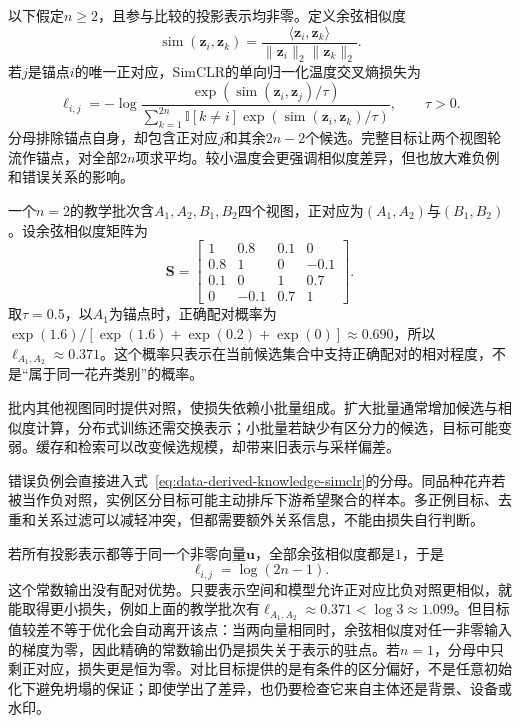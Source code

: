 以下假定$n\geq2$，且参与比较的投影表示均非零。定义余弦相似度
\[
  \operatorname{sim}(\bm{z}_i,\bm{z}_k)
  =\frac{\langle\bm{z}_i,\bm{z}_k\rangle}
  {\lVert\bm{z}_i\rVert_2\lVert\bm{z}_k\rVert_2}.
\]
若$j$是锚点$i$的唯一正对应，SimCLR的单向归一化温度交叉熵损失为
\begin{equation}
  \ell_{i,j}
  =-\log
  \frac{\exp\!\left(\operatorname{sim}(\bm{z}_i,\bm{z}_j)/\tau\right)}
  {\displaystyle\sum_{k=1}^{2n}\mathbb{I}[k\neq i]\exp\!\left(\operatorname{sim}(\bm{z}_i,\bm{z}_k)/\tau\right)},
  \qquad \tau>0.
  \label{eq:data-derived-knowledge-simclr}
\end{equation}
分母排除锚点自身，却包含正对应$j$和其余$2n-2$个候选。完整目标让两个视图轮流作锚点，对全部$2n$项求平均。较小温度会更强调相似度差异，但也放大难负例和错误关系的影响。

一个$n=2$的教学批次含$A_1,A_2,B_1,B_2$四个视图，正对应为$(A_1,A_2)$与$(B_1,B_2)$。设余弦相似度矩阵为
\[
  \bm{S}=
  \begin{bmatrix}
  1&0.8&0.1&0\\
  0.8&1&0&-0.1\\
  0.1&0&1&0.7\\
  0&-0.1&0.7&1
  \end{bmatrix}.
\]
取$\tau=0.5$，以$A_1$为锚点时，正确配对概率为$\exp(1.6)/[\exp(1.6)+\exp(0.2)+\exp(0)]\approx0.690$，所以$\ell_{A_1,A_2}\approx0.371$。这个概率只表示在当前候选集合中支持正确配对的相对程度，不是“属于同一花卉类别”的概率。

批内其他视图同时提供对照，使损失依赖小批量组成。扩大批量通常增加候选与相似度计算，分布式训练还需交换表示；小批量若缺少有区分力的候选，目标可能变弱。缓存和检索可以改变候选规模，却带来旧表示与采样偏差。

错误负例会直接进入式~\eqref{eq:data-derived-knowledge-simclr}的分母。同品种花卉若被当作负对照，实例区分目标可能主动排斥下游希望聚合的样本。多正例目标、去重和关系过滤可以减轻冲突，但都需要额外关系信息，不能由损失自行判断。

若所有投影表示都等于同一个非零向量$\bm{u}$，全部余弦相似度都是$1$，于是
\[
  \ell_{i,j}=\log(2n-1).
\]
这个常数输出没有配对优势。只要表示空间和模型允许正对应比负对照更相似，就能取得更小损失，例如上面的教学批次有$\ell_{A_1,A_2}\approx0.371<\log3\approx1.099$。但目标值较差不等于优化会自动离开该点：当两向量相同时，余弦相似度对任一非零输入的梯度为零，因此精确的常数输出仍是损失关于表示的驻点。若$n=1$，分母中只剩正对应，损失更是恒为零。对比目标提供的是有条件的区分偏好，不是任意初始化下避免坍塌的保证；即使学出了差异，也仍要检查它来自主体还是背景、设备或水印。

